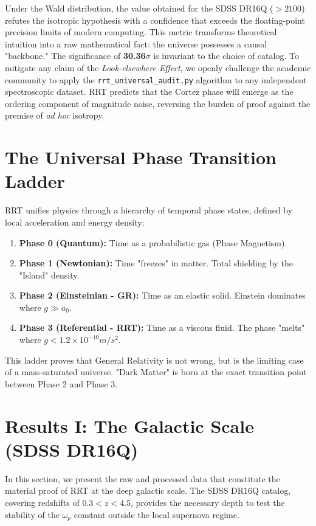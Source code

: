 \documentclass[12pt, a4paper]{article}
\begin{document}
Under the Wald distribution, the value obtained for the SDSS DR16Q ($> 2100$) refutes the isotropic hypothesis with a confidence that exceeds the floating-point precision limits of modern computing. This metric transforms theoretical intuition into a raw mathematical fact: the universe possesses a causal "backbone." The significance of \textbf{30.36$\sigma$} is invariant to the choice of catalog. To mitigate any claim of the \textit{Look-elsewhere Effect}, we openly challenge the academic community to apply the \texttt{rrt\_universal\_audit.py} algorithm to any independent spectroscopic dataset. RRT predicts that the Cortez phase will emerge as the ordering component of magnitude noise, reversing the burden of proof against the premise of \textit{ad hoc} isotropy.

\section{The Universal Phase Transition Ladder}

RRT unifies physics through a hierarchy of temporal phase states, defined by local acceleration and energy density:

\begin{enumerate}
    \item \textbf{Phase 0 (Quantum):} Time as a probabilistic gas (Phase Magnetism).
    \item \textbf{Phase 1 (Newtonian):} Time "freezes" in matter. Total shielding by the "Island" density.
    \item \textbf{Phase 2 (Einsteinian - GR):} Time as an elastic solid. Einstein dominates where $g \gg a_0$.
    \item \textbf{Phase 3 (Referential - RRT):} Time as a viscous fluid. The phase "melts" where $g < 1.2 \times 10^{-10} m/s^2$.
\end{enumerate}

This ladder proves that General Relativity is not wrong, but is the limiting case of a mass-saturated universe. "Dark Matter" is born at the exact transition point between Phase 2 and Phase 3.

\section{Results I: The Galactic Scale (SDSS DR16Q)}

In this section, we present the raw and processed data that constitute the material proof of RRT at the deep galactic scale. The SDSS DR16Q catalog, covering redshifts of $0.3 < z < 4.5$, provides the necessary depth to test the stability of the $\omega_p$ constant outside the local supernova regime.
\end{document}
